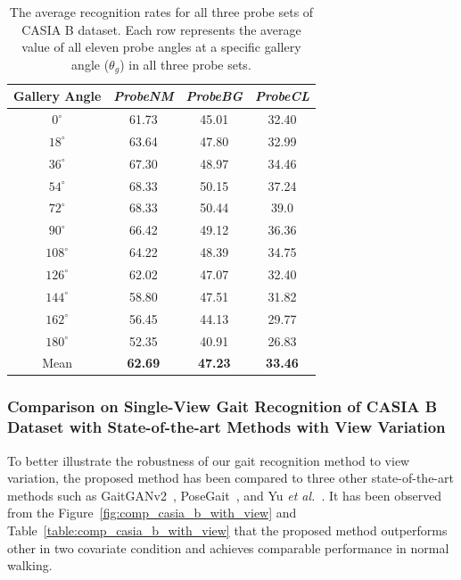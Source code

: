 \begin{table}[t]
	\centering
	\caption{The average recognition rates for all three probe sets of CASIA B dataset. Each row represents the average value of all eleven probe angles at a specific gallery angle ($ \theta_g $) in all three probe sets. \label{table:result_casia_b_with_view}}
	{\begin{tabular*}{22pc}{cccc}\hline
			Gallery Angle &\textit{ProbeNM} &\textit{ProbeBG} &\textit{ProbeCL} \\\hline\noalign{\smallskip}
			${0^{\circ}}$	&61.73  &45.01  &32.40 \\\noalign{\smallskip}
			${18^{\circ}}$  &63.64  &47.80  &32.99 \\\noalign{\smallskip}
			${36^{\circ}}$	&67.30  &48.97  &34.46 \\\noalign{\smallskip}
			${54^{\circ}}$	&68.33  &50.15  &37.24 \\\noalign{\smallskip}
			${72^{\circ}}$	&68.33  &50.44  &39.0  \\\noalign{\smallskip}
			${90^{\circ}}$	&66.42  &49.12  &36.36  \\\noalign{\smallskip}
			${108^{\circ}}$ &64.22  &48.39  &34.75  \\\noalign{\smallskip}
			${126^{\circ}}$ &62.02  &47.07  &32.40  \\\noalign{\smallskip}
			${144^{\circ}}$ &58.80  &47.51  &31.82  \\\noalign{\smallskip}
			${162^{\circ}}$	&56.45  &44.13  &29.77  \\\noalign{\smallskip}
			${180^{\circ}}$ &52.35  &40.91  &26.83  \\\noalign{\smallskip}
			Mean &\textbf{62.69}  &\textbf{47.23} &\textbf{33.46} \\\hline
			
	\end{tabular*}}{}
\end{table}



\subsubsection{Comparison on Single-View Gait Recognition of CASIA B Dataset with State-of-the-art Methods with View Variation}
To better illustrate the robustness of our gait recognition method to view variation, the proposed method has been compared to three other state-of-the-art methods such as GaitGANv2~\cite{Yu_19}, PoseGait~\cite{Liao_19}, and Yu \textit{et al.}~\cite{Yu_17_spae}.  It has been observed from the Figure~\ref{fig:comp_casia_b_with_view} and Table~\ref{table:comp_casia_b_with_view} that the proposed method outperforms other in two covariate condition and achieves comparable performance in normal walking. 

